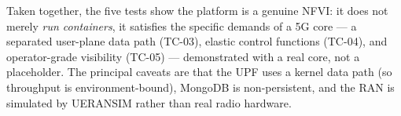Taken together, the five tests show the platform is a genuine NFVI: it does not
merely \emph{run containers}, it satisfies the specific demands of a 5G core ---
a separated user-plane data path (TC-03), elastic control functions (TC-04),
and operator-grade visibility (TC-05) --- demonstrated with a real core, not a
placeholder. The principal caveats are that the UPF uses a kernel data path
(so throughput is environment-bound), MongoDB is non-persistent, and the RAN is
simulated by UERANSIM rather than real radio hardware.
